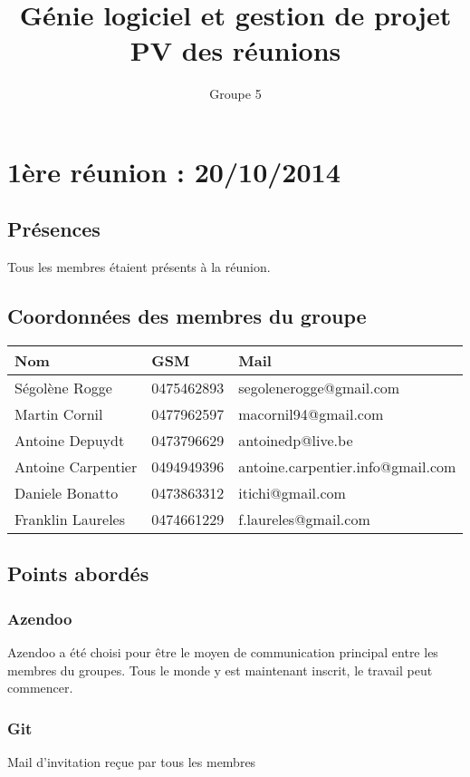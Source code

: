 \documentclass[12pt,a4paper]{article}
\title{Génie logiciel et gestion de projet \\ PV des réunions}
\author{Groupe 5}
\begin{document}
\maketitle

\newpage
\section{1ère réunion : 20/10/2014}
	
	\subsection{Présences}
		Tous les membres étaient présents à la réunion.	
	
	\subsection{Coordonnées des membres du groupe}

		\begin{tabular}{|lll|}
			\hline
			Nom & GSM & Mail \\
			\hline
			\hline
			Ségolène Rogge & 0475462893 & segolenerogge@gmail.com \\
			Martin Cornil & 0477962597 & macornil94@gmail.com \\
			Antoine Depuydt & 0473796629 & antoinedp@live.be \\
			Antoine Carpentier & 0494949396 & antoine.carpentier.info@gmail.com \\
			Daniele Bonatto & 0473863312 & itichi@gmail.com \\
			Franklin Laureles & 0474661229 & f.laureles@gmail.com \\
			\hline
		\end{tabular}

	\subsection{Points abordés}
		
		\subsubsection{Azendoo}
			Azendoo a été choisi pour être le moyen de communication principal entre les membres du groupes. Tous le monde y est maintenant inscrit, le travail peut commencer.
		\subsubsection{Git}
			Mail d'invitation reçue par tous les membres
\end{document}
